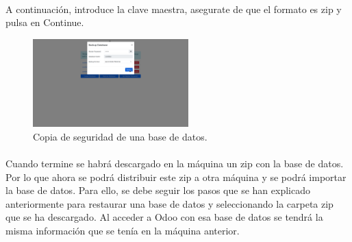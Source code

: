 \documentclass[paper=a4wide, fontsize=11pt]{report}	 %
\begin{document}
\paragraph{}
A continuación, introduce la clave maestra, asegurate de que el formato es zip y pulsa en Continue.
\begin{figure}[h]
    \centering
    \includegraphics[width=6cm]{backupDb2.png}
    \caption{Copia de seguridad de una base de datos.}
    \label{fig:faqs}
\end{figure}
\paragraph{}
Cuando termine se habrá descargado en la máquina un zip con la base de datos. Por lo que ahora se podrá distribuir este zip a otra máquina y se podrá importar la base de datos. Para ello, se debe seguir los pasos que se han explicado anteriormente para restaurar una base de datos y seleccionando la carpeta zip que se ha descargado.
Al acceder a Odoo con esa base de datos se tendrá la misma información que se tenía en la máquina anterior.
\end{document}
